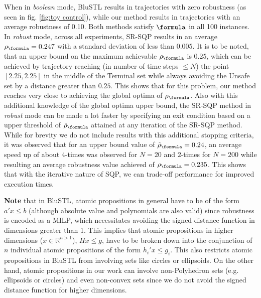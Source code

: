 \begin{exmp}
When in \textit{boolean} mode, BluSTL results in trajectories with zero robustness (as seen in fig. \ref{fig:toy control}), while our method results in trajectories with an average robustness of 0.10. Both methods satisfy $\formula$ in all 100 instances. In \textit{robust} mode, across all experiments, SR-SQP results in an average $\rob_{\formula}=0.247$ with a standard deviation of less than $0.005$. It is to be noted, that an upper bound on the maximum achievable $\rob_{\formula}$ is $0.25$, which can be achieved by trajectory reaching (in number of time steps $\leq N$) the point $[2.25,2.25]$ in the middle of the Terminal set while always avoiding the Unsafe set by a distance greater than $0.25$. This shows that for this problem, our method reaches very close to achieving the global optima of $\rob_{\formula}$. Also with this additional knowledge of the global optima upper bound, the SR-SQP method in \textit{robust} mode can be made a lot faster by specifying an exit condition based on a upper threshold of $\srob_{\formula}$ attained at any iteration of the SR-SQP method. While for brevity we do not include results with this additional stopping criteria, it was observed that for an upper bound value of $\srob_{\formula}=0.24$, an average speed up of about $4$-times was observed for $N=20$ and $2$-times for $N=200$ while resulting an average robustness value achieved of $\rob_{\formula} = 0.235$. This shows that with the iterative nature of SQP, we can trade-off performance for improved execution times.

\textbf{Note} that in BluSTL, atomic propositions in general have to be of the form $a'x\leq b$ (although absolute value and polynomials are also valid) since robustness is encoded as a MILP, which necessitates avoiding the signed distance function in dimensions greater than 1. This implies that atomic propositions in higher dimensions ($x\in \mathbb{R}^{n>1}$), $Hx \leq g$, have to be broken down into the conjunction of $n$ individual atomic propositions of the form $h_i'x \leq g_i$. This also restricts atomic propositions in BluSTL from involving sets like circles or ellipsoids. On the other hand, atomic propositions in our work can involve non-Polyhedron sets (e.g. ellipsoids or circles) and even non-convex sets since we do not avoid the signed distance function for higher dimensions.


\end{exmp}
